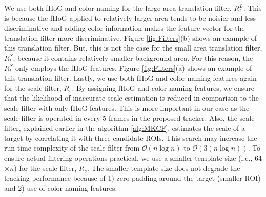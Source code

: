\documentclass[10pt,twocolumn,letterpaper]{article}
\begin{document}
We use both fHoG \cite{felzenszwalb2010object} and color-naming
\cite{van2009learning} for the large area translation filter,
$R_{t}^{L}$. This is because the fHoG applied to relatively larger
area tends to be noisier and less discriminative and adding color
information makes the feature vector for the translation filter 
more discriminative. Figure \ref{fig:Filters}(b) shows an example of 
this translation filter. But, this is not the case for the small area 
translation filter, $R_{t}^{S}$, because it contains relatively smaller background area. 
For this reason, the $R_{t}^{S}$ only employs the fHoG features. 
Figure \ref{fig:Filters}(a) shows an example of this
translation filter. Lastly, we use both fHoG and color-naming features
again for the scale filter, $R_{s}$. By assigning fHoG and
color-naming features, we ensure that the likelihood of inaccurate
scale estimation is reduced in comparison to the scale filter with
only fHoG features. This is more important in our case as the scale
filter is operated in every 5 frames in the proposed tracker. Also,
the scale filter, explained earlier in the algorithm \ref{alg:MKCF},
estimates the scale of a target by correlating it with three candidate
ROIs. This search may increase the run-time complexity of the scale
filter from $\mathcal{O}(n\log n)$ to $\mathcal{O}(3(n\log n))$. To
ensure actual filtering operations practical, we use a smaller
template size (i.e., 64$\times n$) for the scale filter, $R_{s}$. The
smaller template size does not degrade the tracking performance
because of 1) zero padding around the target (smaller ROI) and 2) use
of color-naming features.
\end{document}
